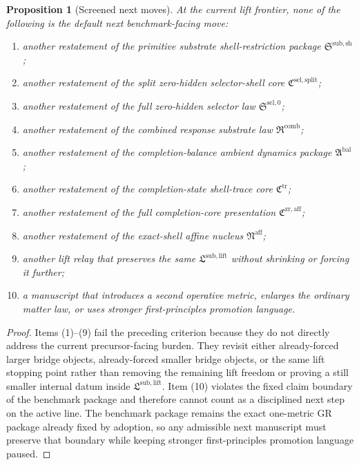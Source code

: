 \documentclass[11pt]{article}
\newcommand{\CompletionCore}{\mathfrak C^{\mathrm{zr,aff}}}
\newcommand{\TraceCore}{\mathfrak C^{\mathrm{tr}}}
\newcommand{\AffineNucleus}{\mathfrak N^{\mathrm{aff}}}
\newcommand{\AmbientPackage}{\mathfrak A^{\mathrm{bal}}}
\newcommand{\CombinedLaw}{\mathfrak R^{\mathrm{comb}}}
\newcommand{\SelectorLaw}{\mathfrak S^{\mathrm{sel},0}}
\newcommand{\SelectorCore}{\mathfrak C^{\mathrm{sel,split}}}
\newcommand{\ShellRestriction}{\mathfrak S^{\mathrm{sub,sh}}}
\newcommand{\LiftPackage}{\mathfrak L^{\mathrm{sub,lift}}}
\newtheorem{proposition}{Proposition}
\begin{document}
\begin{proposition}[Screened next moves]
At the current lift frontier, none of the following is the default next benchmark-facing move:
\begin{enumerate}
    \item another restatement of the primitive substrate shell-restriction package \(\ShellRestriction\);
    \item another restatement of the split zero-hidden selector-shell core \(\SelectorCore\);
    \item another restatement of the full zero-hidden selector law \(\SelectorLaw\);
    \item another restatement of the combined response substrate law \(\CombinedLaw\);
    \item another restatement of the completion-balance ambient dynamics package \(\AmbientPackage\);
    \item another restatement of the completion-state shell-trace core \(\TraceCore\);
    \item another restatement of the full completion-core presentation \(\CompletionCore\);
    \item another restatement of the exact-shell affine nucleus \(\AffineNucleus\);
    \item another lift relay that preserves the same \(\LiftPackage\) without shrinking or forcing it further;
    \item a manuscript that introduces a second operative metric, enlarges the ordinary matter law, or uses stronger first-principles promotion language.
\end{enumerate}
\end{proposition}

\begin{proof}
Items (1)--(9) fail the preceding criterion because they do not directly address the current precursor-facing burden. They revisit either already-forced larger bridge objects, already-forced smaller bridge objects, or the same lift stopping point rather than removing the remaining lift freedom or proving a still smaller internal datum inside \(\LiftPackage\). Item (10) violates the fixed claim boundary of the benchmark package and therefore cannot count as a disciplined next step on the active line. The benchmark package remains the exact one-metric GR package already fixed by adoption, so any admissible next manuscript must preserve that boundary while keeping stronger first-principles promotion language paused.
\end{proof}
\end{document}
